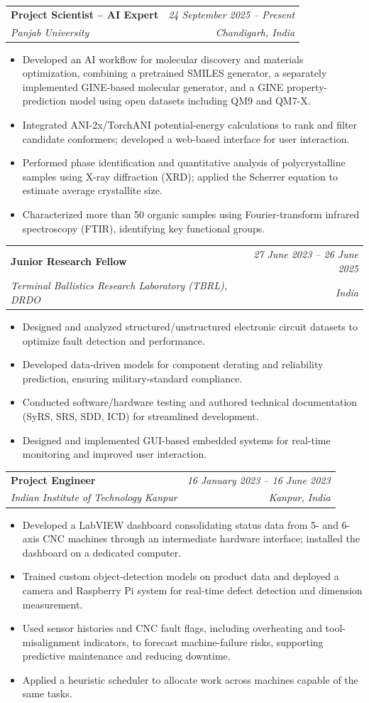\documentclass[a4paper,11pt]{article}
\makeatletter
\newcommand{\roleentry}[4]{%
  \begin{tabular*}{\textwidth}{@{}l@{\extracolsep{\fill}}r@{}}
    \textbf{#1} & \textit{#2} \\
    \textit{#3} & \textit{#4} \\
  \end{tabular*}\par\vspace{-3pt}%
}
\newcommand{\cvbullet}[1]{\item #1}
\makeatother
\begin{document}
\roleentry{Project Scientist -- AI Expert}{24 September 2025 -- Present}{Panjab University}{Chandigarh, India}
\begin{itemize}
  \cvbullet{Developed an AI workflow for molecular discovery and materials optimization, combining a pretrained SMILES generator, a separately implemented GINE-based molecular generator, and a GINE property-prediction model using open datasets including QM9 and QM7-X.}
  \cvbullet{Integrated ANI-2x/TorchANI potential-energy calculations to rank and filter candidate conformers; developed a web-based interface for user interaction.}
  \cvbullet{Performed phase identification and quantitative analysis of polycrystalline samples using X-ray diffraction (XRD); applied the Scherrer equation to estimate average crystallite size.}
  \cvbullet{Characterized more than 50 organic samples using Fourier-transform infrared spectroscopy (FTIR), identifying key functional groups.}
\end{itemize}

\roleentry{Junior Research Fellow}{27 June 2023 -- 26 June 2025}{Terminal Ballistics Research Laboratory (TBRL), DRDO}{India}
\begin{itemize}
  \cvbullet{Designed and analyzed structured/unstructured electronic circuit datasets to optimize fault detection and performance.}
  \cvbullet{Developed data-driven models for component derating and reliability prediction, ensuring military-standard compliance.}
  \cvbullet{Conducted software/hardware testing and authored technical documentation (SyRS, SRS, SDD, ICD) for streamlined development.}
  \cvbullet{Designed and implemented GUI-based embedded systems for real-time monitoring and improved user interaction.}
\end{itemize}

\roleentry{Project Engineer}{16 January 2023 -- 16 June 2023}{Indian Institute of Technology Kanpur}{Kanpur, India}
\begin{itemize}
  \cvbullet{Developed a LabVIEW dashboard consolidating status data from 5- and 6-axis CNC machines through an intermediate hardware interface; installed the dashboard on a dedicated computer.}
  \cvbullet{Trained custom object-detection models on product data and deployed a camera and Raspberry Pi system for real-time defect detection and dimension measurement.}
  \cvbullet{Used sensor histories and CNC fault flags, including overheating and tool-misalignment indicators, to forecast machine-failure risks, supporting predictive maintenance and reducing downtime.}
  \cvbullet{Applied a heuristic scheduler to allocate work across machines capable of the same tasks.}
\end{itemize}
\end{document}
